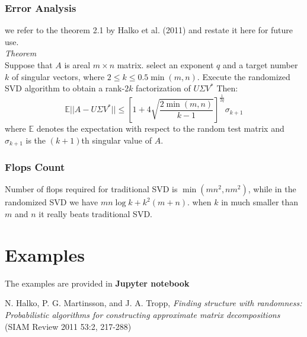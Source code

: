 \documentclass[a4paper,10pt]{article}
\begin{document}
\subsubsection{Error Analysis}
we refer to the theorem 2.1 by Halko et al. (2011) and restate it here for future use. \\
\textit{Theorem}\\
Suppose that $A$ is areal $m \times n$  matrix. select an exponent $q$ and a target number $k$ of singular vectors, where $2 \leq k \leq 0.5\min{(m, n)}$. Execute the randomized SVD algorithm to obtain a rank-$2k$ factorization of $U\Sigma V^*$ Then:
\begin{equation}
\mathbb{E} ||A-U\Sigma V^*|| \leq [1+4\sqrt{\frac{2\min{(m,n)}}{k-1}}]^{\frac{1}{2q}} \sigma_{k+1}
\end{equation}
where $\mathbb{E}$ denotes the expectation with respect to the random test matrix and $\sigma_{k+1}$ is the $(k+1)$th singular value of $A$. 

\subsubsection{Flops Count}
Number of flops required for traditional SVD is $\min(mn^2,nm^2)$, while in the randomized SVD we have $mn\log{k}+ k^2(m+n)$. when $k$ in much smaller than $m$ and $n$ it really beats traditional SVD.

 
\section{Examples}
The examples are provided in \textbf{Jupyter notebook}


\begin{thebibliography}{}


    N. Halko, P. G. Martinsson, and J. A. Tropp,
\textit{Finding structure with randomness: Probabilistic algorithms for constructing approximate matrix decompositions} (SIAM Review 2011 53:2, 217-288) 

   \end{thebibliography}
\end{document}
